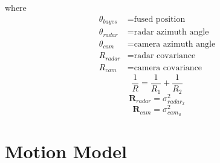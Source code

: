where
\begin{align*}
    \theta_{bayes} &= \text{fused position}\\
    \theta_{radar} &= \text{radar azimuth angle}\\
    \theta_{cam} &= \text{camera azimuth angle}\\
    R_{radar} &= \text{radar covariance}\\
    R_{cam} &= \text{camera covariance}
\end{align*}
\begin{equation}\label{equ:bayes4}
    \frac{1}{R}=\frac{1}{R_1}+\frac{1}{R_2}
\end{equation}
\begin{equation}\label{equ:2-radar_R}
    \mathbf{R}_{radar} = 
        \sigma_{radar_x}^2 
\end{equation}
\begin{equation}\label{equ:2-R_cam}
    \mathbf{R}_{cam} = 
        \sigma_{cam_u}^2
\end{equation}


\section{Motion Model}\label{sec:2-kalman_filter}

